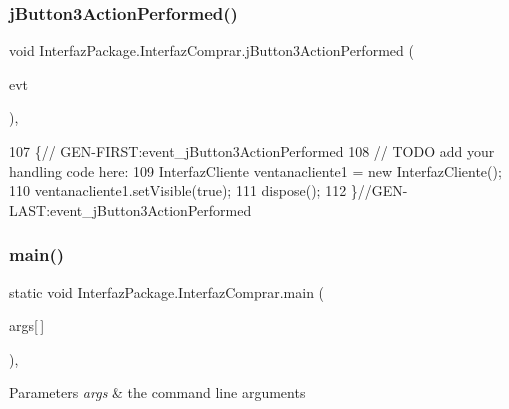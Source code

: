 \subsubsection{\texorpdfstring{j\+Button3\+Action\+Performed()}{jButton3ActionPerformed()}}
{\footnotesize\ttfamily void Interfaz\+Package.\+Interfaz\+Comprar.\+j\+Button3\+Action\+Performed (\begin{DoxyParamCaption}\item[{java.\+awt.\+event.\+Action\+Event}]{evt }\end{DoxyParamCaption})\hspace{0.3cm}{\ttfamily [inline]}, {\ttfamily [private]}}


\begin{DoxyCode}
107                                                                          \{\textcolor{comment}{//
      GEN-FIRST:event\_jButton3ActionPerformed}
108         \textcolor{comment}{// TODO add your handling code here:}
109         InterfazCliente ventanacliente1 = \textcolor{keyword}{new} InterfazCliente();
110         ventanacliente1.setVisible(\textcolor{keyword}{true});
111         dispose();
112     \}\textcolor{comment}{//GEN-LAST:event\_jButton3ActionPerformed}
\end{DoxyCode}
\mbox{\label{class_interfaz_package_1_1_interfaz_comprar_acbcd31e7253a1c9add6125392284a0fd}} 
\subsubsection{\texorpdfstring{main()}{main()}}
{\footnotesize\ttfamily static void Interfaz\+Package.\+Interfaz\+Comprar.\+main (\begin{DoxyParamCaption}\item[{String}]{args\mbox{[}$\,$\mbox{]} }\end{DoxyParamCaption})\hspace{0.3cm}{\ttfamily [inline]}, {\ttfamily [static]}}


\begin{DoxyParams}{Parameters}
{\em args} & the command line arguments \\
\hline
\end{DoxyParams}

